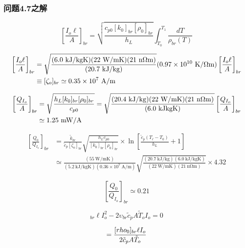 \subsubsection{问题4.7之解}

\begin{equation}
\left[\frac{I_o\ell}{A}\right]_{br}=\sqrt{\frac{c_{p0}[k_0]_{br}[\rho_0]_{br}}{h_L}}\int_{T_0}^{T_1}\frac{dT}{\rho_{br}(T)}
\end{equation}


\begin{align}%
\left[\frac{I_o\ell}{A}\right]_{br}&=\sqrt{\frac{(6.0\ \mathrm{kJ/kgK})(22\ \mathrm{W/mK})(21\ \mathrm{n\Omega m})}{(20.7\ \mathrm{kJ/kg})}}(0.97\times10^{10}\ \mathrm{K/\Omega m})
\left[\frac{I_o\ell}{A}\right]_{br}\\\notag
&\equiv[\zeta_o]_{br}\simeq 0.35\times 10^7\ \mathrm{A/m}
\end{align}

\begin{align}%
\left[\frac{Q_{I_o}}{A}\right]_{br}&=\sqrt{\frac{h_L[k_0]_{br}[\rho_0]_{br}}{c_{p0}}}=\sqrt{\frac{(20.4\ \mathrm{kJ/kg})(22\ \mathrm{W/mK})(21\ \mathrm{n\Omega m})}{(6.0\ \mathrm{kJkgK})}}
\left[\frac{Q_{I_o}}{A}\right]_{br}\\\notag
&\simeq 1.25\ \mathrm{mW/A}
\end{align}

\begin{align*}
\left[\frac{Q_0}{Q_{I_o}}\right]_{br}&=\frac{\tilde{k}_{br}}{\tilde{c}_p[\zeta_o]_{br}}\sqrt{\frac{h_Lc_{p0}}{[k_0]_{br}[\rho_0]_{br}}}\times\ln\left[\frac{\tilde{c}_p(T_\ell-T_0)}{h_L}+1\right] \\
&\simeq\frac{(55\ \mathrm{W/mK})}{(5.2\ \mathrm{kJ/kgK})(0.36\times 10^7\ \mathrm{A/m})}\sqrt{\frac{(20.7\ \mathrm{kJ/kg})(6.0\ \mathrm{kJ/kgK})}{(22\ \mathrm{W/mK})(21\ \mathrm{n\Omega m})}}\times 4.32
\end{align*}

\begin{equation}%
\left[\frac{Q_0}{Q_{I_o}}\right]_{br}\simeq0.21
\end{equation}

\begin{equation}
[\rho_0]_{br}\ell I_{o}^{2}-2\upsilon_{br}\tilde{c}_pA\tilde{T}_oI_o=0
\end{equation}

\begin{equation}%
\unboldmath=\frac{[rho_0]_{br}\ell I_o}{2\tilde{c}_pA\tilde{T}_o}
\end{equation}

